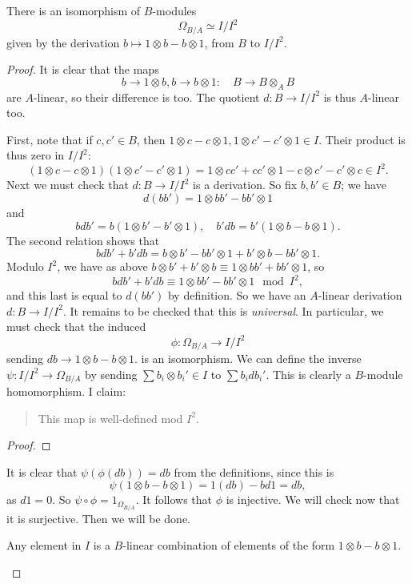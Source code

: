 \begin{proposition} 
There is an isomorphism of $B$-modules
\[ \Omega_{B/A} \simeq I/I^2  \]
given by the derivation $b \mapsto 1 \otimes b - b \otimes 1$, from $B$ to
$I/I^2$.
\end{proposition} 
\begin{proof}
It is clear that the maps
\[ b \to 1 \otimes b, b \to b \otimes 1: \quad B \to B \otimes_A B   \]
are $A$-linear, so their difference is too. The quotient $d:B \to I/I^2$ is thus
$A$-linear too. 

First, note that if $c,c' \in B$, then $1 \otimes c - c \otimes 1, 1 \otimes c'
- c' \otimes 1 \in I$. Their product is thus zero in $I/I^2$:
\[  (1 \otimes c - c \otimes 1)(1 \otimes c'
- c' \otimes 1) = 1 \otimes cc' + cc' \otimes 1  - c \otimes c' - c' \otimes c
  \in I^2.\]
Next
we must check that $d: B \to I/I^2$ is a derivation. So fix $b, b' \in B$; we
have
\[ d(bb') =   1 \otimes bb'- bb' \otimes 1\]
and
\[ bdb' = b (   1 \otimes b'-b' \otimes 1), \quad b' db = b'(1
\otimes b - b \otimes 1  ).  \]
The second relation shows that
\[ bdb' + b' db =   b \otimes b' -  bb' \otimes 1+ b' \otimes b - bb' \otimes
1 . \]
Modulo $I^2$, we have as above $b \otimes b' + b' \otimes b \equiv 1 \otimes
bb' + bb' \otimes 1$, so 
\[   bdb' + b' db \equiv 1 \otimes bb' - bb' \otimes 1 \mod I^2,  \]
and this last is equal to $d(bb')$ by definition. So we have an $A$-linear
derivation $d: B \to I/I^2$. It remains to be checked that this is
\emph{universal}. In particular, we must check that the induced
\[ \phi: \Omega_{B/A} \to I/I^2  \]
sending $db \to 1 \otimes b - b \otimes 1$.
is an isomorphism. We can define the inverse $\psi: I/I^2 \to \Omega_{B/A}$ by sending $\sum b_i \otimes b_i'
\in I$
to $\sum b_i db_i'$. This is clearly a $B$-module homomorphism.
I claim:
\begin{quote}
This map is well-defined mod $I^2$.
\end{quote}
\begin{proof} 

\end{proof} 

It is clear that $\psi (\phi(db)) = db$ from the definitions, since this
is
\[ \psi( 1 \otimes b - b \otimes 1) = 1 (db) - b d1 = db,  \]
as $d1 = 0$. So $\psi \circ \phi = 1_{\Omega_{B/A}}$. 
It follows that $\phi$ is injective. 
We will check now that it is surjective.
Then we will be done.

\begin{lemma} 
Any element in $I$ is a $B$-linear combination of elements of the form $1
\otimes b - b \otimes 1$.
\end{lemma} 


\end{proof}
